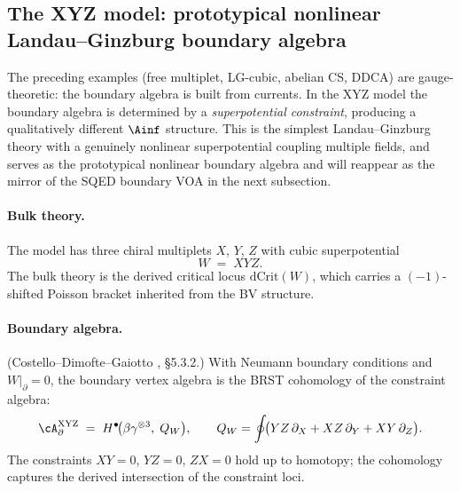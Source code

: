 \subsection{The XYZ model: prototypical nonlinear Landau--Ginzburg boundary algebra}
\label{subsec:xyz-model-boundary}

The preceding examples (free multiplet, LG-cubic, abelian CS, DDCA)
are gauge-theoretic: the boundary algebra is built from currents.
In the XYZ model the boundary algebra is determined by a
\emph{superpotential constraint}, producing a qualitatively different
$\Ainf$ structure.
This is the simplest Landau--Ginzburg theory with a genuinely
nonlinear superpotential coupling multiple fields, and serves as the
prototypical nonlinear boundary algebra and will reappear as the mirror
of the SQED boundary VOA in the next subsection.

\paragraph{Bulk theory.}
The model has three chiral multiplets $X$, $Y$, $Z$ with cubic
superpotential
\begin{equation}\label{eq:xyz-superpotential}
 W \;=\; XYZ.
\end{equation}
The bulk theory is the derived critical locus $\mathrm{dCrit}(W)$, which
carries a $(-1)$-shifted Poisson bracket inherited from the BV structure.

\paragraph{Boundary algebra.}
\begin{proposition}
\label{prop:xyz-model-boundary-voa}
\textup{(Costello--Dimofte--Gaiotto \cite{CDG2023}, \S5.3.2.)}
With Neumann boundary conditions and $W|_{\partial} = 0$, the boundary
vertex algebra is the BRST cohomology of the constraint algebra:
\[
 \cA_\partial^{\mathrm{XYZ}}
 \;=\;
 H^\bullet\!\bigl(\beta\gamma^{\otimes 3},\; Q_W\bigr),
 \qquad
 Q_W = \oint\!\bigl(YZ\,\partial_X + XZ\,\partial_Y + XY\,\partial_Z\bigr).
\]
The constraints $XY = 0$, $YZ = 0$, $ZX = 0$ hold up to homotopy; the
cohomology captures the derived intersection of the constraint loci.
\end{proposition}

